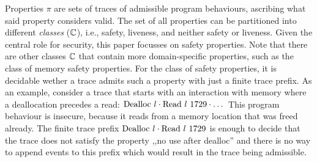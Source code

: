 \documentclass[utf8,acmsmall,review,screen,dvipsnames]{acmart}
\begin{document}
Properties $\pi$ are sets of traces of admissible program behaviours, ascribing what said property considers valid.
%
The set of all properties can be partitioned into different {\em classes} ($\mathbb{C}$), i.e., safety, liveness, and neither safety or liveness.
Given the central role for security, this paper focusses on safety properties.
Note that there are other classes $\mathbb{C}$ that contain more domain-specific properties, such as the class of memory safety properties.
For the class of safety properties, it is decidable wether a trace admits such a property with just a finite trace prefix.
As an example, consider a trace that starts with an interaction with memory where a deallocation precedes a read: $\ev{Dealloc\ \loc}\cdot\ev{Read\ \loc\ 1729}\cdot\dots$
This program behaviour is insecure, because it reads from a memory location that was freed already.
The finite trace prefix $\ev{Dealloc\ \loc}\cdot\ev{Read\ \loc\ 1729}$ is enough to decide that the trace does not satisfy the property ,,no use after dealloc'' and there is no way to append events to this prefix which would result in the trace being admissible.
%
\end{document}
